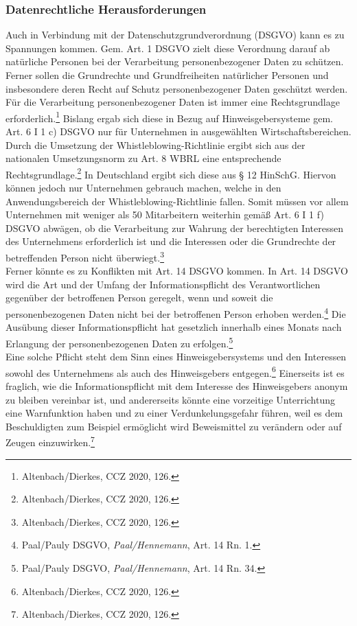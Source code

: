 \subsubsection{Datenrechtliche Herausforderungen}
Auch in Verbindung mit der Datenschutzgrundverordnung (DSGVO) kann es zu Spannungen kommen.
Gem. Art. 1 DSGVO zielt diese Verordnung darauf ab natürliche Personen bei der Verarbeitung personenbezogener Daten zu schützen.
Ferner sollen die Grundrechte und Grundfreiheiten natürlicher Personen und insbesondere deren Recht auf Schutz personenbezogener Daten geschützt werden.
Für die Verarbeitung personenbezogener Daten ist immer eine Rechtsgrundlage erforderlich.\footnote{Altenbach/Dierkes, CCZ 2020, 126.}
Bislang ergab sich diese in Bezug auf Hinweisgebersysteme gem. Art. 6 I 1 c) DSGVO nur für Unternehmen in ausgewählten Wirtschaftsbereichen.
Durch die Umsetzung der Whistleblowing-Richtlinie ergibt sich aus der nationalen Umsetzungsnorm zu Art. 8 WBRL eine entsprechende Rechtsgrundlage.\footnote{Altenbach/Dierkes, CCZ 2020, 126.}
In Deutschland ergibt sich diese aus § 12 HinSchG.
Hiervon können jedoch nur Unternehmen gebrauch machen, welche in den Anwendungsbereich der Whistleblowing-Richtlinie fallen.
Somit müssen vor allem Unternehmen mit weniger als 50 Mitarbeitern weiterhin gemäß Art. 6 I 1 f) DSGVO abwägen, ob die Verarbeitung zur Wahrung der berechtigten Interessen des Unternehmens erforderlich ist und die Interessen oder die Grundrechte der betreffenden Person nicht überwiegt.\footnote{Altenbach/Dierkes, CCZ 2020, 126.}\\
Ferner könnte es zu Konflikten mit Art. 14 DSGVO kommen.
In Art. 14 DSGVO wird die Art und der Umfang der Informationspflicht des Verantwortlichen gegenüber der betroffenen Person geregelt, wenn und soweit die personenbezogenen Daten nicht bei der betroffenen Person erhoben werden.\footnote{Paal/Pauly DSGVO, \textit{Paal/Hennemann}, Art. 14 Rn. 1.}
Die Ausübung dieser Informationspflicht hat gesetzlich innerhalb eines Monats nach Erlangung der personenbezogenen Daten zu erfolgen.\footnote{Paal/Pauly DSGVO, \textit{Paal/Hennemann}, Art. 14 Rn. 34.}\\
Eine solche Pflicht steht dem Sinn eines Hinweisgebersystems und den Interessen sowohl des Unternehmens als auch des Hinweisgebers entgegen.\footnote{Altenbach/Dierkes, CCZ 2020, 126.}
Einerseits ist es fraglich, wie die Informationspflicht mit dem Interesse des Hinweisgebers anonym zu bleiben vereinbar ist, und andererseits könnte eine vorzeitige Unterrichtung eine Warnfunktion haben und zu einer Verdunkelungsgefahr führen, weil es dem Beschuldigten zum Beispiel ermöglicht wird Beweismittel zu verändern oder auf Zeugen einzuwirken.\footnote{Altenbach/Dierkes, CCZ 2020, 126.}
